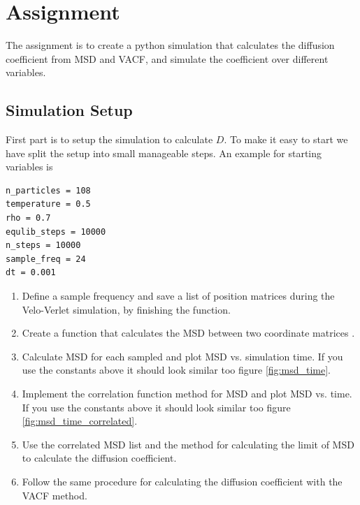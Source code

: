 \documentclass{article}
\begin{document}
\newpage
\section{Assignment}

The assignment is to create a python simulation that calculates 
the diffusion coefficient from MSD and VACF, and simulate
the coefficient over different variables.

\subsection{Simulation Setup}

First part is to setup the simulation to calculate $D$.
To make it easy to start we have split the setup into
small manageable steps. An example for starting variables is

\begin{lstlisting}
n_particles = 108
temperature = 0.5
rho = 0.7
equlib_steps = 10000
n_steps = 10000
sample_freq = 24
dt = 0.001
\end{lstlisting}

\begin{enumerate}

    \item Define a sample frequency and save
    a list of position matrices  during the
    Velo-Verlet simulation, by finishing the 
    function.

    \item Create a function that calculates the MSD
    between two coordinate matrices .

    \item Calculate MSD for each sampled  and
    plot MSD vs. simulation time.
    If you use the constants above it should look similar
    too figure \ref{fig:msd_time}.

    \item Implement the correlation function method
    for MSD and plot MSD vs. time.
    If you use the constants above it should look similar
    too figure \ref{fig:msd_time_correlated}.

    \item Use the correlated MSD list and
    the method for calculating the limit of MSD
    to calculate the diffusion coefficient.

    \item Follow the same procedure for calculating
    the diffusion coefficient with the VACF method.

\end{enumerate}
\end{document}
